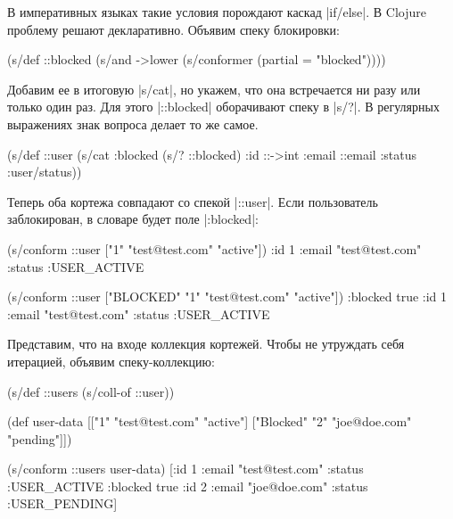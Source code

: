 В императивных языках такие условия порождают каскад \spverb|if/else|. В Clojure
проблему решают декларативно. Объявим спеку блокировки:

\begin{english}
  \begin{clojure}
(s/def ::blocked
  (s/and
   ->lower
   (s/conformer (partial = "blocked"))))
  \end{clojure}
\end{english}

Добавим ее в итоговую \spverb|s/cat|, но укажем, что она встречается ни разу или
только один раз. Для этого \spverb|::blocked| оборачивают спеку в \spverb|s/?|.
В регулярных выражениях знак вопроса делает то же самое.

\begin{english}
  \begin{clojure}
(s/def ::user
  (s/cat :blocked (s/? ::blocked)
         :id ::->int
         :email ::email
         :status :user/status))
  \end{clojure}
\end{english}

Теперь оба кортежа совпадают со спекой \spverb|::user|. Если пользователь
заблокирован, в словаре будет поле \spverb|:blocked|:

\begin{english}
  \begin{clojure}
(s/conform ::user ["1" "test@test.com" "active"])
{:id 1 :email "test@test.com" :status :USER_ACTIVE}

(s/conform ::user ["BLOCKED" "1" "test@test.com" "active"])
{:blocked true :id 1 :email "test@test.com" :status :USER_ACTIVE}
  \end{clojure}
\end{english}

Представим, что на входе коллекция кортежей. Чтобы не утруждать себя итерацией,
объявим спеку-коллекцию:

\begin{english}
  \begin{clojure}
(s/def ::users (s/coll-of ::user))

(def user-data
  [["1" "test@test.com" "active"]
   ["Blocked" "2" "joe@doe.com" "pending"]])

(s/conform ::users user-data)
[{:id 1 :email "test@test.com" :status :USER_ACTIVE}
 {:blocked true :id 2 :email "joe@doe.com" :status :USER_PENDING}]
  \end{clojure}
\end{english}

